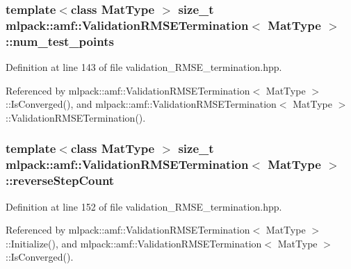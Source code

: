 \subsubsection[{num\-\_\-test\-\_\-points}]{\setlength{\rightskip}{0pt plus 5cm}template$<$class Mat\-Type $>$ size\-\_\-t {\bf mlpack\-::amf\-::\-Validation\-R\-M\-S\-E\-Termination}$<$ Mat\-Type $>$\-::num\-\_\-test\-\_\-points\hspace{0.3cm}{\ttfamily [private]}}\label{classmlpack_1_1amf_1_1ValidationRMSETermination_a374e464e94ebebf15e927b5ecac5636f}


Definition at line 143 of file validation\-\_\-\-R\-M\-S\-E\-\_\-termination.\-hpp.



Referenced by mlpack\-::amf\-::\-Validation\-R\-M\-S\-E\-Termination$<$ Mat\-Type $>$\-::\-Is\-Converged(), and mlpack\-::amf\-::\-Validation\-R\-M\-S\-E\-Termination$<$ Mat\-Type $>$\-::\-Validation\-R\-M\-S\-E\-Termination().

\subsubsection[{reverse\-Step\-Count}]{\setlength{\rightskip}{0pt plus 5cm}template$<$class Mat\-Type $>$ size\-\_\-t {\bf mlpack\-::amf\-::\-Validation\-R\-M\-S\-E\-Termination}$<$ Mat\-Type $>$\-::reverse\-Step\-Count\hspace{0.3cm}{\ttfamily [private]}}\label{classmlpack_1_1amf_1_1ValidationRMSETermination_a64fb4214dbd7910232440b016a98644b}


Definition at line 152 of file validation\-\_\-\-R\-M\-S\-E\-\_\-termination.\-hpp.



Referenced by mlpack\-::amf\-::\-Validation\-R\-M\-S\-E\-Termination$<$ Mat\-Type $>$\-::\-Initialize(), and mlpack\-::amf\-::\-Validation\-R\-M\-S\-E\-Termination$<$ Mat\-Type $>$\-::\-Is\-Converged().

